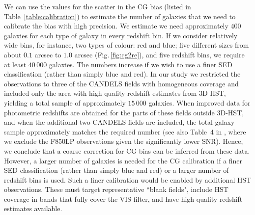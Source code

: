 \documentclass[useAMS,usenatbib]{mnras}
\begin{document}
We can use the values for the scatter in the CG bias (listed in Table~\ref{table:calibration}) to
estimate the number of galaxies that we need to calibrate the bias with high precision. We estimate
we need approximately $400$ galaxies for each type of galaxy in every redshift bin. If we consider
relatively wide bins, for instance, two types of colour: red and blue; five different sizes from
about $0.1$ arcsec to $1.0$ arcsec (Fig.\,\ref{fig:cg2re}), and five redshift bins, we require at least
$40\,000$ galaxies. The numbers increase if we wish to use a finer SED classification (rather than
simply blue and red). In our study we restricted the observations to three of the CANDELS fields
with homogeneous coverage and included only the area with high-quality redshift estimates from
3D-HST, yielding a total sample of approximately $15\,000$ galaxies. When improved data for photometric
redshifts are obtained for the parts of these fields outside 3D-HST, and when the additional
two CANDELS fields are included, the total galaxy sample approximately matches the required number
(see also Table~4 in , where we exclude the F850LP observations given the
significantly lower SNR). Hence, we conclude that a coarse correction for CG bias can be inferred
from these data. However, a larger number of galaxies is needed for the CG calibration if a finer
SED classification (rather than simply blue and red) or a larger number of redshift bins is
used. Such a finer calibration would be enabled by additional HST observations. These must target
representative ``blank fields", include HST coverage in bands that fully cover the VIS filter,
and have high quality redshift estimates available.
\end{document}
